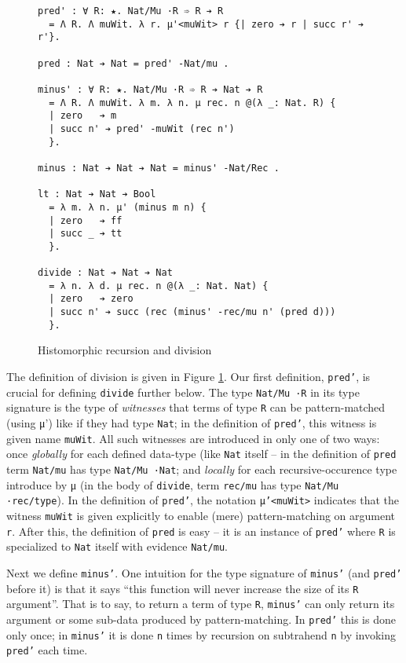 \documentclass{article}
\begin{document}
\label{sec:hist-rec}
\begin{figure}[h]
\begin{verbatim}
pred' : ∀ R: ★. Nat/Mu ·R ➾ R ➔ R
  = Λ R. Λ muWit. λ r. μ'<muWit> r {| zero ➔ r | succ r' ➔ r'}.

pred : Nat ➔ Nat = pred' -Nat/mu .

minus' : ∀ R: ★. Nat/Mu ·R ➾ R ➔ Nat ➔ R
  = Λ R. Λ muWit. λ m. λ n. μ rec. n @(λ _: Nat. R) {
  | zero   ➔ m
  | succ n' ➔ pred' -muWit (rec n')
  }.

minus : Nat ➔ Nat ➔ Nat = minus' -Nat/Rec .

lt : Nat ➔ Nat ➔ Bool
  = λ m. λ n. μ' (minus m n) {
  | zero   ➔ ff
  | succ _ ➔ tt
  }.

divide : Nat ➔ Nat ➔ Nat
  = λ n. λ d. μ rec. n @(λ _: Nat. Nat) {
  | zero   ➔ zero
  | succ n' ➔ succ (rec (minus' -rec/mu n' (pred d)))
  }.
\end{verbatim}
  \caption{Histomorphic recursion and division}
  \label{fig:ex-data-div}
\end{figure}

The definition of division is given in Figure \ref{fig:ex-data-div}. Our first
definition, \texttt{pred'}, is crucial for defining \texttt{divide} further
below. The type \texttt{Nat/Mu ·R} in its type signature is the type of
\textit{witnesses} that terms of type \texttt{R} can be pattern-matched (using μ')
like if they had type \texttt{Nat}; in the definition of \texttt{pred'}, this witness
is given name \texttt{muWit}. All such witnesses are introduced in only one of
two ways: once \textit{globally} for each defined data-type (like \texttt{Nat}
itself -- in the definition of \texttt{pred} term \texttt{Nat/mu} has type
\texttt{Nat/Mu ·Nat}; and \textit{locally} for each recursive-occurence type
introduce by μ (in the body of \texttt{divide}, term \texttt{rec/mu} has type
\texttt{Nat/Mu ·rec/type}). In the definition of \texttt{pred'}, the notation
\texttt{μ'<muWit>} indicates that the witness \texttt{muWit} is given explicitly
to enable (mere) pattern-matching on argument \texttt{r}. After this, the
definition of \texttt{pred} is easy -- it is an instance of \texttt{pred'} where
\texttt{R} is specialized to \texttt{Nat} itself with evidence \texttt{Nat/mu}.

Next we define \texttt{minus'}. One intuition for the type signature of
\texttt{minus'} (and \texttt{pred'} before it) is that it says ``this function
will never increase the size of its \texttt{R} argument''. That is to say, to
return a term of type \texttt{R}, \texttt{minus'} can only return its argument
or some sub-data produced by pattern-matching. In
\texttt{pred'} this is done only once; in \texttt{minus'} it is done \texttt{n}
times by recursion on subtrahend \texttt{n} by invoking \texttt{pred'} each time.
\end{document}
